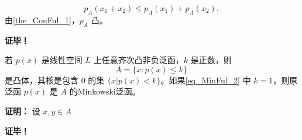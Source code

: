  \begin{equation}
p_A(x_1+x_2)\leq p_A(x_1)+p_A(x_2).~
 \end{equation}
 由\autoref{the_ConFul_1}，$p_A$ 凸。








\textbf{证毕！}

\begin{theorem}{}
若 $p(x)$ 是线性空间 $L$ 上任意齐次凸非负泛函，$k$ 是正数，则
\begin{equation}\label{eq_MinFul_2}
A=\{x:p(x)\leq k\}~
\end{equation}
是凸体，其核是包含 $0$ 的集 $\{x|p(x)<k\}$。如果\autoref{eq_MinFul_2} 中 $k=1$，则原泛函 $p(x)$ 是 $A$ 的Minkowski泛函。
\end{theorem}

\textbf{证明：}
设 $x,y\in A$



\textbf{证毕！}
